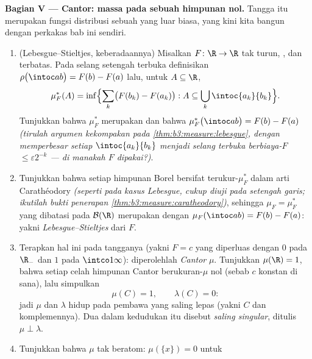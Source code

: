 \begin{problem}
\medskip
\noindent\textbf{Bagian V ---  Cantor: massa pada sebuah himpunan
nol.} Tangga itu merupakan fungsi distribusi sebuah  yang
luar biasa, yang kini kita bangun dengan perkakas bab ini
sendiri.
\begin{enumerate}[resume]
  \item (Lebesgue--Stieltjes, keberadaannya) Misalkan $F\colon\R\to\R$
        tak turun, , dan terbatas. Pada selang setengah
        terbuka definisikan $\rho\bigl(\intoc ab\bigr) = F(b) -
        F(a)$ lalu, untuk $A \subseteq \R$,
        \[
        \mu_F^*(A) = \inf\Bigl\{\sum_k\bigl(F(b_k) -
        F(a_k)\bigr) : A \subseteq
        \bigcup_k\intoc{a_k}{b_k}\Bigr\} .
        \]
        Tunjukkan bahwa $\mu_F^*$ merupakan  dan bahwa
        $\mu_F^*\bigl(\intoc ab\bigr) = F(b) - F(a)$
        \emph{(tirulah argumen kekompakan pada
        \cref{thm:b3:measure:lebesgue}, dengan memperbesar setiap
        $\intoc{a_k}{b_k}$ menjadi selang terbuka berbiaya-$F$
        $\leq \varepsilon2^{-k}$ --- di manakah
         $F$ dipakai?)}.
  \item Tunjukkan bahwa setiap himpunan Borel bersifat
        terukur-$\mu_F^*$ dalam arti Carathéodory
        \emph{(seperti pada kasus Lebesgue, cukup diuji
        pada setengah garis; ikutilah bukti
        penerapan \cref{thm:b3:measure:caratheodory})}, sehingga
        $\mu_F = \mu_F^*$ yang dibatasi pada $\mathcal B(\R)$
        merupakan  dengan $\mu_F(\intoc ab) = F(b) - F(a)$:
        yakni \emph{ Lebesgue--Stieltjes} dari $F$.
  \item Terapkan hal ini pada tangganya (yakni $F = c$ yang diperluas dengan $0$
        pada $\R_-$ dan $1$ pada $\intco1\infty$): diperolehlah
        \emph{ Cantor} $\mu$. Tunjukkan $\mu(\R) = 1$, bahwa
        setiap celah himpunan Cantor berukuran-$\mu$ nol (sebab $c$
        konstan di sana), lalu simpulkan
        \[
        \mu(C) = 1, \qquad \lambda(C) = 0 :
        \]
        jadi $\mu$ dan $\lambda$ hidup pada pembawa yang saling lepas (yakni $C$ dan
        komplemennya). Dua  dalam kedudukan itu
        disebut \emph{saling singular}, ditulis $\mu \perp
        \lambda$.
  \item Tunjukkan bahwa $\mu$ tak beratom: $\mu(\{x\}) = 0$ untuk

\end{enumerate}
\end{problem}
